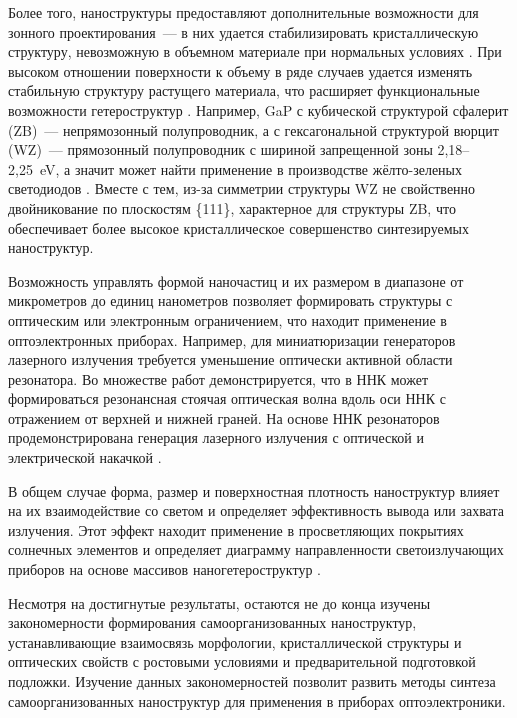 Более того, наноструктуры предоставляют дополнительные возможности для зонного проектирования~--- в них удается стабилизировать кристаллическую структуру, невозможную в объемном материале при нормальных условиях \cite{Mohseni2009}. При высоком отношении поверхности к объему в ряде случаев удается изменять стабильную структуру растущего материала, что расширяет функциональные возможности гетероструктур \cite{Spirkoska2009}. Например, GaP с кубической структурой сфалерит (ZB)~--- непрямозонный полупроводник, а с гексагональной структурой вюрцит (WZ)~--- прямозонный полупроводник с шириной запрещенной зоны 2,18--2,25~\si{\electronvolt}, а значит может найти применение в производстве жёлто-зеленых светодиодов \cite{Assali2013}. Вместе с тем, из-за симметрии структуры WZ не свойственно двойникование по плоскостям \{111\}, характерное для структуры ZB, что обеспечивает более высокое кристаллическое совершенство синтезируемых наноструктур.

Возможность управлять формой наночастиц и их размером в диапазоне от микрометров до единиц нанометров позволяет формировать структуры с оптическим или электронным ограничением, что находит применение в оптоэлектронных приборах. Например, для миниатюризации генераторов лазерного излучения требуется уменьшение оптически активной области резонатора. Во множестве работ демонстрируется, что в ННК может формироваться резонансная стоячая оптическая волна вдоль оси ННК с отражением от верхней и нижней граней. На основе ННК резонаторов продемонстрирована генерация лазерного излучения с оптической и электрической накачкой \cite{Eaton2016}.

В общем случае форма, размер и поверхностная плотность наноструктур влияет на их взаимодействие со светом и определяет эффективность вывода или захвата излучения. Этот эффект находит применение в просветляющих покрытиях солнечных элементов \cite{Mozharov2015b, Krogman2005} и определяет диаграмму направленности светоизлучающих приборов на основе массивов наногетероструктур \cite{Eaton2016}.

Несмотря на достигнутые результаты, остаются не до конца изучены закономерности формирования самоорганизованных наноструктур, устанавливающие взаимосвязь морфологии, кристаллической структуры и оптических свойств с ростовыми условиями и предварительной подготовкой подложки. Изучение данных закономерностей позволит развить методы синтеза самоорганизованных наноструктур для применения в приборах оптоэлектроники.


